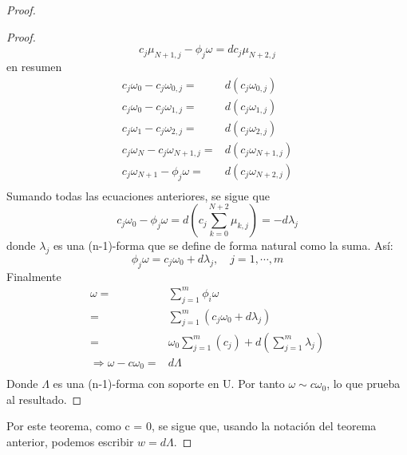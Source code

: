 \documentclass[12pt]{report}
\theoremstyle{largebreak}
\begin{document}
\begin{proof}
\begin{proof}
            \begin{equation*}
                c_j\mu_{N+1,j}-\phi_j\omega =dc_j\mu_{N+2,j}
            \end{equation*}
            en resumen
            \begin{equation*}
                \begin{split}
                    c_j\omega_0 -c_j\omega_{0,j}=&d(c_j\omega_{0,j})\\
                    c_j\omega_0 -c_j\omega_{1,j}=&d(c_j\omega_{1,j})\\
                    c_j\omega_1 -c_j\omega_{2,j}=&d(c_j\omega_{2,j})\\
                    c_j\omega_N -c_j\omega_{N+1,j}=&d(c_j\omega_{N+1,j})\\
                    c_j\omega_{N+1} -\phi_j\omega=&d(c_j\omega_{N+2,j})\\
                \end{split}
            \end{equation*}
            Sumando todas las ecuaciones anteriores, se sigue que
            \begin{equation*}
                c_j\omega_0-\phi_j\omega = d\left(c_j\sum_{k=0}^{N+2}\mu_{k,j}\right)=-d\lambda_j
            \end{equation*}
            donde $\lambda_j$ es una (n-1)-forma que se define de forma natural como la suma. Así:
            \begin{equation*}
                \phi_j\omega = c_j\omega_0+d\lambda_j, \quad j=1,\cdots,m
            \end{equation*}
            Finalmente
            \begin{equation*}
                \begin{split}
                    \omega =&\sum_{j=1}^{m}\phi_i\omega\\
                    =&\sum_{j=1}^{m}\left(c_j\omega_0+d\lambda_j\right)\\
                    =&\omega_0\sum_{j=1}^{m}\left(c_j\right)+d\left(\sum_{j=1}^{m}\lambda_j\right)\\
                \Rightarrow \omega - c\omega_0 =& d\Lambda\\
                \end{split}
            \end{equation*}
            Donde $\Lambda$ es una (n-1)-forma con soporte en U. Por tanto $\omega \sim c\omega_0$, lo que prueba al resultado.
        \end{proof}
        
        Por este teorema, como c = 0, se sigue que, usando la notación del teorema anterior, podemos escribir $w=d\Lambda$.
    \end{proof}
\end{document}

